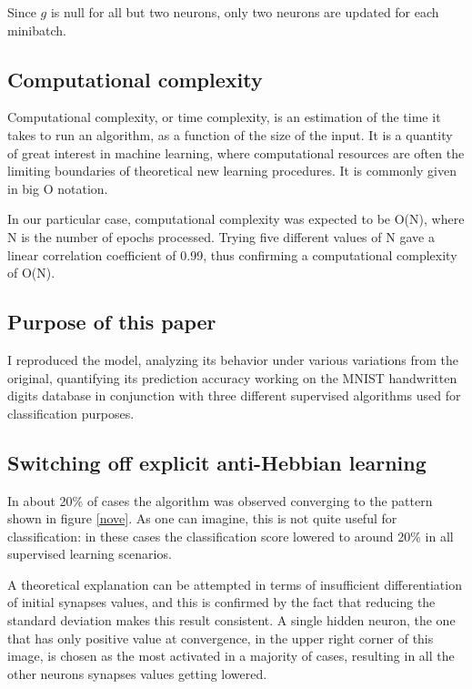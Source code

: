 \documentclass[a4paper]{report}
\begin{document}
Since $g$ is null for all but two neurons, only two neurons are updated for each minibatch.

\subsection{Computational complexity}

Computational complexity, or time complexity, is an estimation of the time it takes to run an algorithm, as a function of the size of the input.
It is a quantity of great interest in machine learning, where computational resources are often the limiting boundaries of theoretical new learning procedures.
It is commonly given in big O notation.

In our particular case, computational complexity was expected to be O(N), where N is the number of epochs processed.
Trying five different values of N gave a linear correlation coefficient of 0.99, thus confirming a computational complexity of O(N).

\subsection{Purpose of this paper}

I reproduced the model, analyzing its behavior under various variations from the original, quantifying its prediction accuracy working on the MNIST handwritten digits database in conjunction with three different supervised algorithms used for classification purposes.

\subsection{Switching off explicit anti-Hebbian learning}

In about 20\% of cases the algorithm was observed converging to the pattern shown in figure \ref{nove}. 
As one can imagine, this is not quite useful for classification:
in these cases the classification score lowered to around 20\% in all supervised learning scenarios.

A theoretical explanation can be attempted in terms of insufficient differentiation of initial synapses values, and this is confirmed by the fact that reducing the standard deviation makes this result consistent.
A single hidden neuron, the one that has only positive value at convergence, in the upper right corner of this image, is chosen as the most activated in a majority of cases, resulting in all the other neurons synapses values getting lowered.
\end{document}
